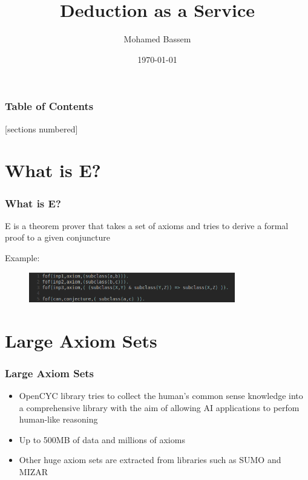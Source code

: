 \documentclass[10pt]{beamer}
\title{Deduction as a Service}
\subtitle{}
\date{\today}
\author{Mohamed Bassem}
\institute{German University in Cairo}
\begin{document}
\maketitle

\begin{frame}
  \frametitle{Table of Contents}
  [sections numbered]
  \tableofcontents[
    hideallsubsections,
  ]
\end{frame}

\section{What is E?}
\begin{frame}[fragile]
  \frametitle{What is E?}

  E is a theorem prover that takes a set of axioms and tries to derive a formal proof to a given conjuncture

  \pause{}
  Example:
  \begin{figure}
    \includegraphics[width=90mm]{imgs/SampleAxioms.png}
  \end{figure}
\end{frame}


\section{Large Axiom Sets}
\begin{frame}[fragile]
  \frametitle{Large Axiom Sets}
  \begin{itemize}
    \item OpenCYC library tries to collect the human's common sense knowledge into a comprehensive library with the aim of allowing AI applications to perfom human-like reasoning\cite{wiki:OpenCYC}
      \item Up to 500MB of data and millions of axioms
      \item Other huge axiom sets are extracted from libraries such as SUMO and MIZAR
  \end{itemize}
\end{frame}
\end{document}
